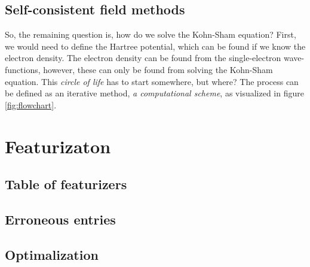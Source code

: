 \section{Self-consistent field methods}
\label{appendix:self-consistent}

So, the remaining question is, how do we solve the Kohn-Sham equation? First, we would need to define the Hartree potential, which can be found if we know the electron density. The electron density can be found from the single-electron wave-functions, however, these can only be found from solving the Kohn-Sham equation. This \textit{circle of life} has to start somewhere, but where? The process can be defined as an iterative method, \textit{a computational scheme}, as visualized in figure \ref{fig:flowchart}.

\clearpage


\clearpage

\chapter{Featurizaton}

\section{Table of featurizers}


\newpage

\section{Erroneous entries}



\clearpage

\section{Optimalization}
\label{appendix:Optimalization}


